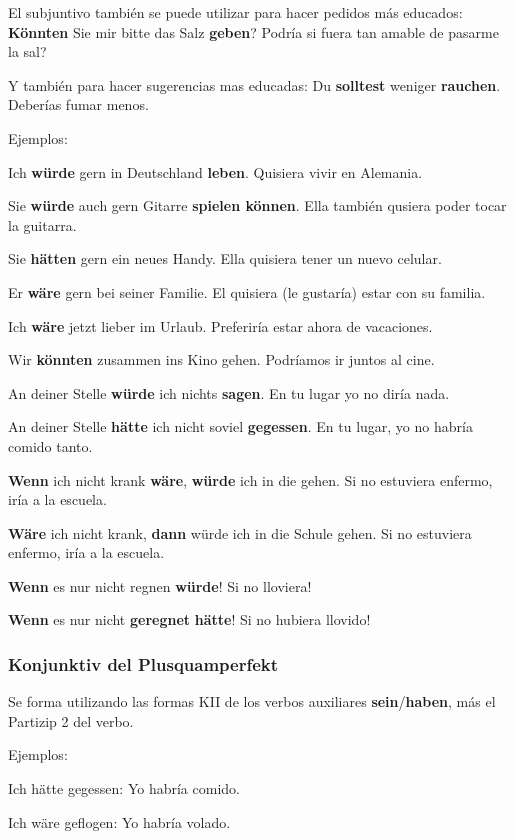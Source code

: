 El subjuntivo también se puede utilizar para hacer pedidos más educados: \textbf{Könnten} Sie mir bitte das Salz \textbf{geben}? Podría si fuera tan amable de pasarme la sal?

Y también para hacer sugerencias mas educadas: Du \textbf{solltest} weniger \textbf{rauchen}. Deberías fumar menos.


Ejemplos:

Ich \textbf{würde} gern in Deutschland \textbf{leben}. Quisiera vivir en Alemania.

Sie \textbf{würde} auch gern Gitarre \textbf{spielen können}. Ella también qusiera poder tocar la guitarra.

Sie \textbf{hätten} gern ein neues Handy. Ella quisiera tener un nuevo celular.

Er \textbf{wäre} gern bei seiner Familie. El quisiera (le gustaría) estar con su familia.

Ich \textbf{wäre} jetzt lieber im Urlaub. Preferiría estar ahora de vacaciones.

Wir \textbf{könnten} zusammen ins Kino gehen. Podríamos ir juntos al cine.

An deiner Stelle \textbf{würde} ich nichts \textbf{sagen}. En tu lugar yo no diría nada.

An deiner Stelle \textbf{hätte} ich nicht soviel \textbf{gegessen}. En tu lugar, yo no habría comido tanto.

 \textbf{Wenn} ich nicht krank \textbf{wäre}, \textbf{würde} ich in die gehen. Si no estuviera enfermo, iría a la escuela.

\textbf{Wäre} ich nicht krank, \textbf{dann} würde ich in die Schule gehen. Si no estuviera enfermo, iría a la escuela.

\textbf{Wenn} es nur nicht regnen \textbf{würde}! Si no lloviera!

\textbf{Wenn} es nur nicht \textbf{geregnet} \textbf{hätte}! Si no hubiera llovido!

\subsubsection{Konjunktiv del Plusquamperfekt}
Se forma utilizando las formas KII de los verbos auxiliares \textbf{sein}/\textbf{haben}, más el Partizip 2 del verbo.

Ejemplos:

Ich hätte gegessen: Yo habría comido.

Ich wäre geflogen: Yo habría volado.

\clearpage

